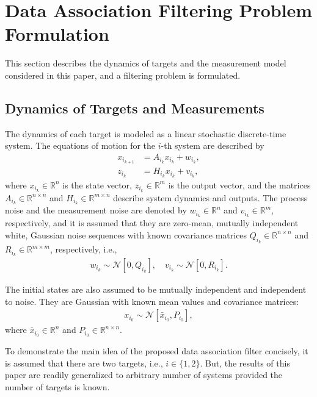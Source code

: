 \documentclass[letterpaper, 10pt, conference]{ieeeconf}
\renewcommand{\Re}{\ensuremath{\mathbb{R}}}
\begin{document}

\section{Data Association Filtering Problem Formulation}
\label{ProbDef}

This section describes the dynamics of targets and the measurement model considered in this paper, and a filtering problem is formulated. 

\subsection{Dynamics of Targets and Measurements}

The dynamics of each target is modeled as a linear stochastic discrete-time system. The equations of motion for the $i$-th system are described by
\begin{align}
x_{i_{k+1}} & = A_{i_k} x_{i_k} + w_{i_k},\label{eqn:xkp}\\
z_{i_k} & = H_{i_k} x_{i_k} + v_{i_k},
\end{align}
where $x_{i_k}\in\Re^n$ is the state vector, $z_{i_k}\in\Re^m$ is the output vector, and  the matrices $A_{i_k}\in\Re^{n\times n}$ and $H_{i_k}\in\Re^{m\times n}$ describe system dynamics and outputs. The process noise and the measurement noise are denoted by $w_{i_k}\in\Re^n$ and $v_{i_k}\in\Re^m$, respectively, and it is assumed that they are zero-mean, mutually independent white, Gaussian noise sequences with known covariance matrices $Q_{i_k}\in\Re^{n\times n}$ and $R_{i_k}\in\Re^{m\times m}$, respectively, i.e.,
\begin{align}
w_{i_k} \sim \mathcal{N}[0,Q_{i_k}],\quad
v_{i_k} \sim \mathcal{N}[0,R_{i_k}].
\end{align}


The initial states are also assumed to be mutually independent and independent to noise. They are Gaussian with known mean values and covariance matrices:
\begin{align}
x_{i_0} \sim \mathcal{N}[\bar x_{i_0}, P_{i_0}],\label{eqn:xi0}
\end{align}
where $\bar x_{i_0}\in\Re^n$ and $P_{i_0}\in\Re^{n\times n}$. 

To demonstrate the main idea of the proposed data association filter concisely, it is assumed that there are two targets, i.e., $i\in\{1,2\}$. But, the results of this paper are readily generalized to arbitrary number of systems provided the number of targets is known.
\end{document}
